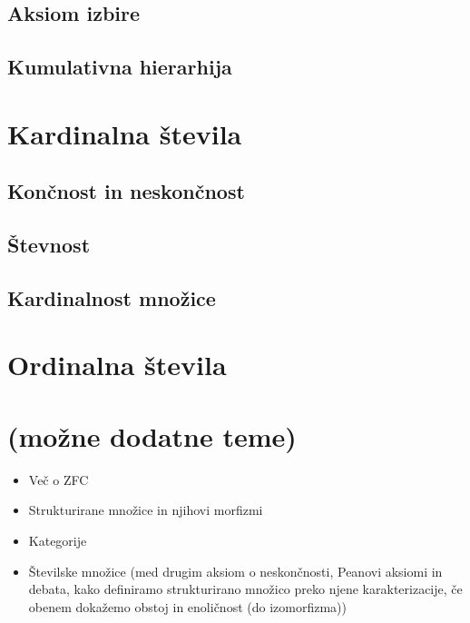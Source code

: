 \documentclass[11pt,a4paper,twoside]{book}
\newcommand{\note}[1]{{\small\textcolor{notecolor}{(#1)}}}
\begin{document}
		\section{Aksiom izbire}
		\section{Kumulativna hierarhija}
	
	\chapter{Kardinalna števila}
		\section{Končnost in neskončnost}
		\section{Števnost}
		\section{Kardinalnost množice}
	
	\chapter{Ordinalna števila}
	
	\chapter{\note{možne dodatne teme}}
		\begin{itemize}
			\item
				Več o ZFC
			\item
				Strukturirane množice in njihovi morfizmi
			\item
				Kategorije
			\item
				Številske množice (med drugim aksiom o neskončnosti, Peanovi aksiomi in debata, kako definiramo strukturirano množico preko njene karakterizacije, če obenem dokažemo obstoj in enoličnost (do izomorfizma))
		\end{itemize}
	
	
\end{document}
